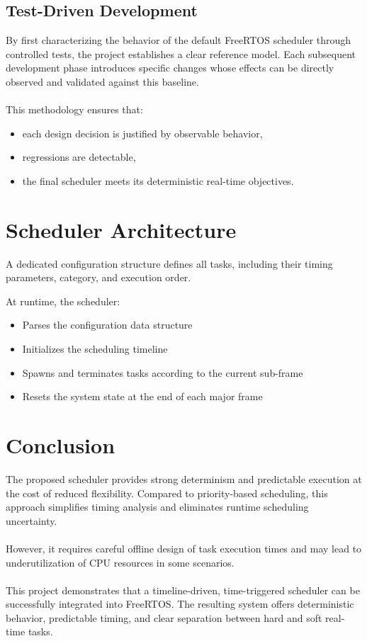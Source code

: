 \documentclass[12pt,english, makeidx, a4paper, titlepage,oneside]{article}
\begin{document}
\subsection{Test-Driven Development}

By first characterizing the behavior of the default FreeRTOS scheduler through controlled tests, the project establishes a clear reference model. Each subsequent development phase introduces specific changes whose effects can be directly observed and validated against this baseline.
\\~\\
This methodology ensures that:
\begin{itemize}
    \item each design decision is justified by observable behavior,
    \item regressions are detectable,
    \item the final scheduler meets its deterministic real-time objectives.
\end{itemize}


\section{Scheduler Architecture}
A dedicated configuration structure defines all tasks, including their timing parameters, category, and execution order.

At runtime, the scheduler:
\begin{itemize}
    \item Parses the configuration data structure
    \item Initializes the scheduling timeline
    \item Spawns and terminates tasks according to the current sub-frame
    \item Resets the system state at the end of each major frame
\end{itemize}

\section{Conclusion}
The proposed scheduler provides strong determinism and predictable execution at the cost of reduced flexibility.
Compared to priority-based scheduling, this approach simplifies timing analysis and eliminates runtime scheduling uncertainty.
\\~\\
However, it requires careful offline design of task execution times and may lead to underutilization of CPU resources in some scenarios.
\\~\\
This project demonstrates that a timeline-driven, time-triggered scheduler can be successfully integrated into FreeRTOS.
The resulting system offers deterministic behavior, predictable timing, and clear separation between hard and soft real-time tasks.
\end{document}
